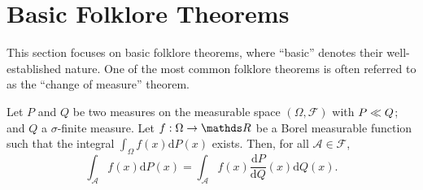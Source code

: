 \documentclass[lettersize,onecolumn]{IEEEtran}
\begin{document}
\section{Basic Folklore Theorems}
This section focuses on basic folklore theorems, where ``basic'' denotes their well-established nature. One of the most common folklore theorems is often referred to as the ``change of measure'' theorem.
%
\begin{theorem}\label{ThCOM}
Let $P$ and $Q$ be two measures on the measurable space $\left( \Omega, \mathscr{F}\right)$ with ${P}\ll{Q}$; and $Q$ a $\sigma$-finite measure. Let $f: \Omega \to \reals$ be a Borel 
measurable function such that the integral $\int_{\Omega} f(x) \mathrm{d}P(x)$ exists. Then,  for all $
\mathcal{A} \in \mathscr{F}$,
\begin{equation}\label{EqTheoRNProperties1}
\displaystyle\int_{\mathcal{A}} f(x)\mathrm{d}P(x) = \displaystyle\int_{\mathcal{A}} f(x) \frac{\mathrm{d}P}{\mathrm{d}Q}(x)
 \mathrm{d}Q(x).
\end{equation} 
\end{theorem}
%
\end{document}
